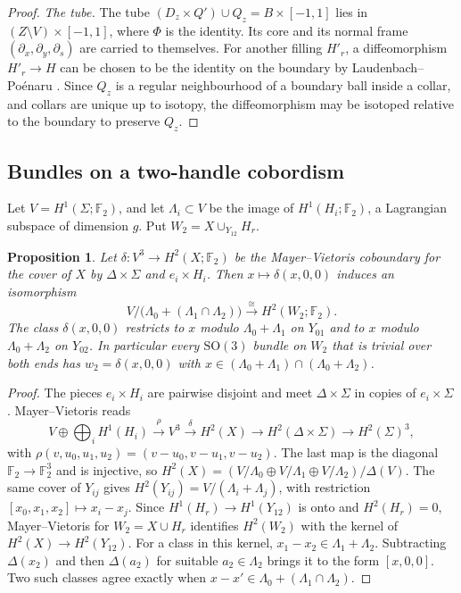 \documentclass[11pt]{amsart}
\newtheorem{proposition}[theorem]{Proposition}
\theoremstyle{definition}
\theoremstyle{remark}
\theoremstyle{plain}
\numberwithin{equation}{section}
\newcommand{\FF}{\mathbb{F}_2}
\newcommand{\SO}{\mathrm{SO}}
\begin{document}
\begin{proof}
\emph{The tube.} The tube $(D_z\times Q')\cup Q_z=B\times[-1,1]$ lies in
$(Z\setminus V)\times[-1,1]$, where $\Phi$ is the identity. Its core and
its normal frame $(\partial_x,\partial_y,\partial_s)$ are carried to
themselves. For another filling $H'_r$, a diffeomorphism $H'_r\to H$
can be chosen to be the identity on the boundary by Laudenbach--Po\'enaru
\cite{LP}. Since $Q_z$ is a regular neighbourhood of a boundary ball
inside a collar, and collars are unique up to isotopy, the diffeomorphism
may be isotoped relative to the boundary to preserve $Q_z$.
\end{proof}

\subsection{Bundles on a two-handle cobordism}\label{subsec:two-handle-bundles}

Let $V=H^1(\Sigma;\FF)$, and let $\Lambda_i\subset V$ be the image of $H^1(H_i;\FF)$, a
Lagrangian subspace of dimension $g$. Put $W_2=X\cup_{Y_{12}}H_r$.

\begin{proposition}\label{prop:bundle-normal-form}
Let $\delta\colon V^3\to H^2(X;\FF)$ be the Mayer--Vietoris coboundary
for the cover of $X$ by $\Delta\times\Sigma$ and $e_i\times H_i$. Then
$x\mapsto\delta(x,0,0)$ induces an isomorphism
\[
V\big/\bigl(\Lambda_0+(\Lambda_1\cap \Lambda_2)\bigr)\xrightarrow{\ \cong\ }H^2(W_2;\FF).
\]
The class $\delta(x,0,0)$ restricts to $x$ modulo $\Lambda_0+\Lambda_1$ on $Y_{01}$
and to $x$ modulo $\Lambda_0+\Lambda_2$ on $Y_{02}$. In particular every $\SO(3)$
bundle on $W_2$ that is trivial over both ends has
$w_2=\delta(x,0,0)$ with $x\in(\Lambda_0+\Lambda_1)\cap(\Lambda_0+\Lambda_2)$.
\end{proposition}

\begin{proof}
The pieces $e_i\times H_i$ are pairwise disjoint and meet
$\Delta\times\Sigma$ in copies of $e_i\times\Sigma$. Mayer--Vietoris
reads
\[
V\oplus\textstyle\bigoplus_iH^1(H_i)\xrightarrow{\rho}V^3
\xrightarrow{\delta}H^2(X)\to H^2(\Delta\times\Sigma)\to
H^2(\Sigma)^3,
\]
with $\rho(v,u_0,u_1,u_2)=(v-u_0,v-u_1,v-u_2)$. The last map is the
diagonal $\FF\to\FF^3$ and is injective, so
$H^2(X)=(V/\Lambda_0\oplus V/\Lambda_1\oplus V/\Lambda_2)/\Delta(V)$. The same cover of
$Y_{ij}$ gives $H^2(Y_{ij})=V/(\Lambda_i+\Lambda_j)$, with restriction
$[x_0,x_1,x_2]\mapsto x_i-x_j$. Since $H^1(H_r)\to H^1(Y_{12})$ is onto
and $H^2(H_r)=0$, Mayer--Vietoris for $W_2=X\cup H_r$ identifies
$H^2(W_2)$ with the kernel of $H^2(X)\to H^2(Y_{12})$. For a class in
this kernel, $x_1-x_2\in \Lambda_1+\Lambda_2$. Subtracting $\Delta(x_2)$ and then
$\Delta(a_2)$ for suitable $a_2\in \Lambda_2$ brings it to the form
$[x,0,0]$. Two such classes agree exactly when $x-x'\in \Lambda_0+(\Lambda_1\cap
\Lambda_2)$.
\end{proof}
\end{document}
